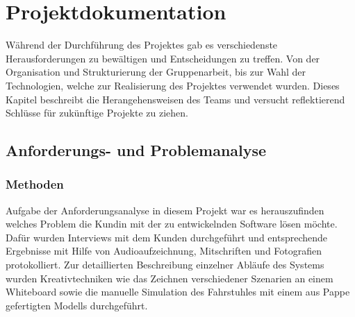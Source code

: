 \part{Projektdokumentation}
Während der Durchführung des Projektes gab es verschiedenste Herausforderungen zu bewältigen und Entscheidungen zu treffen. Von der Organisation und Strukturierung der Gruppenarbeit, bis zur Wahl der Technologien, welche zur Realisierung des Projektes verwendet wurden. Dieses Kapitel beschreibt die Herangehensweisen des Teams und versucht reflektierend Schlüsse für zukünftige Projekte zu ziehen. 
\chapter{Anforderungs- und Problemanalyse}
\section{Methoden}
Aufgabe der Anforderungsanalyse in diesem Projekt war es herauszufinden
welches Problem die Kundin mit der zu entwickelnden Software lösen möchte. Dafür wurden
Interviews mit dem Kunden durchgeführt und entsprechende Ergebnisse mit Hilfe
von Audioaufzeichnung, Mitschriften und Fotografien protokolliert. Zur
detaillierten Beschreibung einzelner Abläufe des Systems wurden
Kreativtechniken wie das Zeichnen verschiedener Szenarien an einem Whiteboard
sowie die manuelle Simulation des Fahrstuhles mit einem aus Pappe gefertigten Modells durchgeführt.
